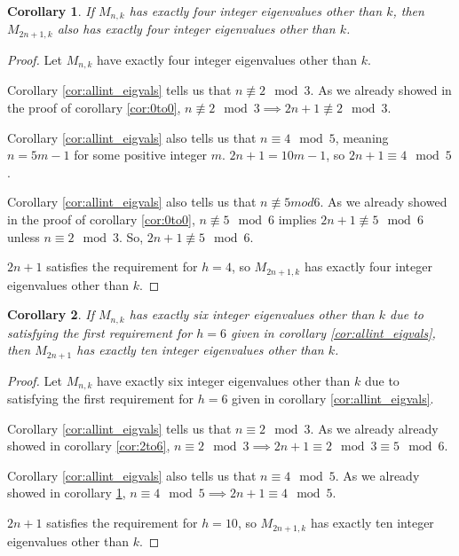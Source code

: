 \documentclass[12pt]{article}
\newtheorem{corollary}{Corollary}
\begin{document}
	\begin{corollary}\label{cor:4to4}
		If $M_{n,k}$ has exactly four integer eigenvalues other than $k$, then
		$M_{2n+1,k}$ also has exactly four integer eigenvalues other than $k$.
	\end{corollary}
	\begin{proof}
		Let $M_{n,k}$ have exactly four integer eigenvalues other than $k$.
		
		Corollary \ref{cor:allint_eigvals} tells us that $n \not\equiv 2 \mod 3$.
		As we already showed in the proof of corollary \ref{cor:0to0}, $n \not \equiv
		2 \mod 3 \implies 2n+1 \not\equiv 2 \mod 3$.
		
		Corollary \ref{cor:allint_eigvals} also tells us that $n \equiv 4 \mod 5$,
		meaning $n = 5m-1$ for some positive integer $m$.
		$2n+1 = 10m-1$, so $2n+1 \equiv 4 \mod 5$.
		
		Corollary \ref{cor:allint_eigvals} also tells us that $n \not\equiv 5 mod 6$.
		As we already showed in the proof of corollary \ref{cor:0to0}, $n \not \equiv
		5 \mod 6$ implies $2n+1 \not\equiv 5 \mod 6$ unless $n \equiv 2 \mod 3$. So,
		$2n+1 \not\equiv 5 \mod 6$.
		
		$2n+1$ satisfies the requirement for $h=4$, so $M_{2n+1,k}$ has exactly four
		integer eigenvalues other than $k$.
	\end{proof}
	
	\begin{corollary}\label{cor:6to10}
		If $M_{n,k}$ has exactly six integer eigenvalues other than $k$ due to
		satisfying the first requirement for $h=6$ given in corollary
		\ref{cor:allint_eigvals}, then $M_{2n+1}$ has exactly ten integer eigenvalues
		other than $k$.
	\end{corollary}
	\begin{proof}
		Let $M_{n,k}$ have exactly six integer eigenvalues other than $k$ due to
		satisfying the first requirement for $h=6$ given in corollary
		\ref{cor:allint_eigvals}.
		
		Corollary \ref{cor:allint_eigvals} tells us that $n \equiv 2 \mod 3$.
		As we already already showed in corollary \ref{cor:2to6}, $n \equiv 2 \mod 3
		\implies 2n+1 \equiv 2 \mod 3 \equiv 5 \mod 6$.
		
		Corollary \ref{cor:allint_eigvals} also tells us that $n \equiv 4 \mod 5$.
		As we already showed in corollary \ref{cor:4to4}, $n \equiv 4 \mod 5 \implies
		2n+1 \equiv 4 \mod 5$.
		
		$2n+1$ satisfies the requirement for $h=10$, so $M_{2n+1,k}$ has exactly ten
		integer eigenvalues other than $k$.
	\end{proof}
	
\end{document}
